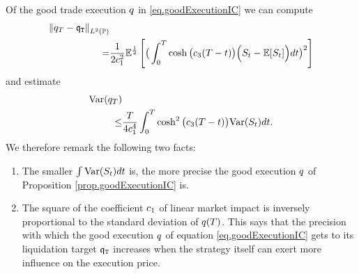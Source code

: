\documentclass[10pt,a4paper]{article}
\begin{document}
	\begin{remark}\label{remark.varianceOfLiquidationError}
		Of the good trade execution  $\inventory$ in \eqref{eq.goodExecutionIC} we can compute 
		\begin{equation*}
		\begin{split}
		\norm[\inventory_\timeHorizon-\liquidationTarget]_{\Ltwo(\Prob)} &\\
		=& \frac{1}{2\coeffMarketImpact\squared} \Expectation^{\half}
		\left[\big(
		\int_{0}^{\timeHorizon} \cosh\big(\ratioAversionOverImpact (T-t)\big) \Big(
		\fundamentalPrice_t-\Expectation[\fundamentalPrice_t]
		\Big)dt
		\big)\squared\right]
		\end{split}
		\end{equation*}
		and estimate
		\begin{equation*}
		\begin{split}
		\Variance(\inventory_\timeHorizon) &\\
		\leq& \frac{T}{4\coeffMarketImpact^{4}} 
		\int_{0}^{T} \cosh\squared\big(\ratioAversionOverImpact (T-t)\big) \Variance(\fundamentalPrice_t)dt.
		\end{split}
		\end{equation*}
		We therefore remark the following two facts:
		\begin{enumerate}
			\item The smaller $\int \Variance(\fundamentalPrice_t)dt$ is, the more precise the good execution $\inventory$ of Proposition \ref{prop.goodExecutionIC} is.
			\item The square of the coefficient $\coeffMarketImpact$ of linear market impact is inversely proportional to the standard deviation of $\inventory(T)$. This says that the precision with which the good execution $\inventory$ of equation \eqref{eq.goodExecutionIC} gets to its liquidation target $\liquidationTarget$ increases when the strategy itself can exert more influence on the execution price. 
		\end{enumerate}
	\end{remark}
	
\end{document}
